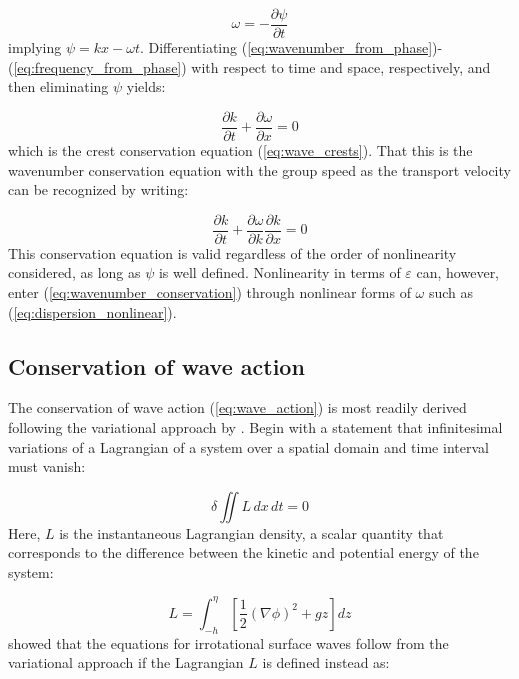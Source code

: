 \documentclass[lineno]{jfm}
\begin{document}
\begin{equation}
  \omega = - \frac{\partial \psi}{\partial t}
  \label{eq:frequency_from_phase}
\end{equation}
implying $\psi = kx - \omega t$.
Differentiating (\ref{eq:wavenumber_from_phase})-(\ref{eq:frequency_from_phase})
with respect to time and space, respectively, and then eliminating $\psi$ yields:

\begin{equation}
  \frac{\partial k}{\partial t} + \frac{\partial \omega}{\partial x} = 0
  \label{eq:wavenumber_conservation}
\end{equation}
which is the crest conservation equation (\ref{eq:wave_crests}).
That this is the wavenumber conservation equation with the group speed as the
transport velocity can be recognized by writing:

\begin{equation}
  \frac{\partial k}{\partial t} + \frac{\partial \omega}{\partial k} \frac{\partial k}{\partial x} = 0
\end{equation}
This conservation equation is valid regardless of the order of nonlinearity
considered, as long as $\psi$ is well defined.
Nonlinearity in terms of $\varepsilon$ can, however, enter (\ref{eq:wavenumber_conservation})
through nonlinear forms of $\omega$ such as (\ref{eq:dispersion_nonlinear}).

\subsection{Conservation of wave action}
\label{appendix:wave_action_conservation}

The conservation of wave action (\ref{eq:wave_action}) is most readily derived
following the variational approach by \citet{whitham1965general}.
Begin with a statement that infinitesimal variations of a Lagrangian of a system
over a spatial domain and time interval must vanish:

\begin{equation}
  \delta \iint L\, dx\,dt = 0
\end{equation}
Here, $L$ is the instantaneous Lagrangian density, a scalar quantity that
corresponds to the difference between the kinetic and potential energy of the
system:

\begin{equation}
  L = \int_{-h}^{\eta} \left[ \frac{1}{2} (\nabla{\phi})^2 + gz \right] dz
  \label{eq:lagrangian_density_energy_difference}
\end{equation}
\citet{luke1967variational} showed that the equations for irrotational
surface waves follow from the variational approach if the Lagrangian $L$ is
defined instead as:
\end{document}
